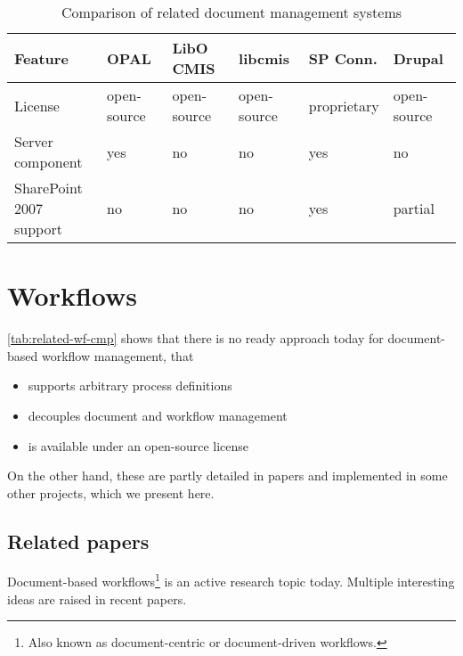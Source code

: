 \begin{table}[H]
  \begin{center}
    \begin{tabular}{| l | l | l | l | l | l |}
    \hline
    \textbf{Feature} & \textbf{OPAL} & \textbf{LibO CMIS} & \textbf{libcmis} & \textbf{SP Conn.} & \textbf{Drupal} \\ \hline
    License          & open-source   & open-source        & open-source      & proprietary                   & open-source \\ \hline
    Server component & yes           & no                 & no               & yes                           & no \\ \hline
    \makecell[l]{SharePoint 2007 \\ support} & no & no    & no               & yes                           & partial \\ \hline
    \end{tabular}
  \end{center}
  \caption{Comparison of related document management systems}
  \label{tab:related-cmp}
\end{table}

\section{Workflows}

\autoref{tab:related-wf-cmp} shows that there is no ready approach today for
document-based workflow management, that

\begin{itemize}
\item supports arbitrary process definitions
\item decouples document and workflow management
\item is available under an open-source license
\end{itemize}

On the other hand, these are partly detailed in papers and implemented in some
other projects, which we present here.

\subsection*{Related papers}

Document-based workflows\footnote{Also known as document-centric or
document-driven workflows.} is an active research topic today. Multiple
interesting ideas are raised in recent papers.

